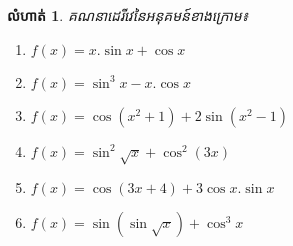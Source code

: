 \documentclass[12pt,fleqn]{book} %
\newtheorem{exercise}{\kml លំហាត់}
\begin{document}
\begin{enumerate}
 
 
\end{enumerate}

\begin{exercise}
គណនាដេរីវេនៃអនុគមន៍ខាងក្រោម៖
\begin{multicols}{2}
\begin{enumerate}
\item $f(x)=x.\sin x+\cos x$
\item $f(x)=\sin^3 x-x.\cos x$
\item $f(x)=\cos (x^2+1)+2\sin (x^2-1)$
\item $f(x)=\sin^2\sqrt{x}+\cos^2 (3x)$
\item $f(x)=\cos (3x+4)+3\cos x.\sin x$
\item $f(x)=\sin (\sin \sqrt{x})+\cos^3 x$
\end{enumerate}
\end{multicols}
\end{exercise}
\end{document}
